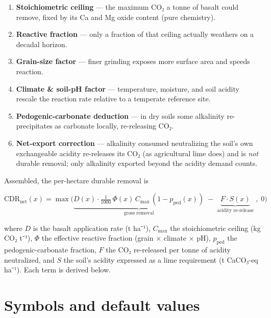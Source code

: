 \documentclass[openany]{book}
\providecommand{\tightlist}{%
  \setlength{\itemsep}{0pt}\setlength{\parskip}{0pt}}
\begin{document}
\begin{enumerate}
\def\labelenumi{\arabic{enumi}.}
\tightlist
\item
  \textbf{Stoichiometric ceiling} --- the maximum CO₂ a tonne of basalt could
  remove, fixed by its Ca and Mg oxide content (pure chemistry).
\item
  \textbf{Reactive fraction} --- only a fraction of that ceiling actually
  weathers on a decadal horizon.
\item
  \textbf{Grain-size factor} --- finer grinding exposes more surface area and
  speeds reaction.
\item
  \textbf{Climate \& soil-pH factor} --- temperature, moisture, and soil
  acidity rescale the reaction rate relative to a temperate reference site.
\item
  \textbf{Pedogenic-carbonate deduction} --- in dry soils some alkalinity
  re-precipitates as carbonate locally, re-releasing CO₂.
\item
  \textbf{Net-export correction} --- alkalinity consumed neutralizing the
  soil's own exchangeable acidity re-releases its CO₂ (as agricultural lime
  does) and is \emph{not} durable removal; only alkalinity exported beyond the
  acidity demand counts.
\end{enumerate}

Assembled, the per-hectare durable removal is

\[
\mathrm{CDR}_{\text{net}}(x)
= \max\!\Big(\underbrace{D(x)\cdot \tfrac{1}{1000}\,\Phi(x)\,C_{\max}\,(1-p_{\text{ped}}(x))}_{\text{gross removal}}
\;-\; \underbrace{F\cdot S(x)}_{\text{acidity re-release}}\;,\; 0\Big)
\]

where \(D\) is the basalt application rate (t ha⁻¹), \(C_{\max}\) the
stoichiometric ceiling (kg CO₂ t⁻¹), \(\Phi\) the effective reactive fraction
(grain × climate × pH), \(p_{\text{ped}}\) the pedogenic-carbonate fraction,
\(F\) the CO₂ re-released per tonne of acidity neutralized, and \(S\) the soil's
acidity expressed as a lime requirement (t CaCO₃-eq ha⁻¹). Each term is derived
below.

\section{Symbols and default values}\label{sec:symbols}
\end{document}
